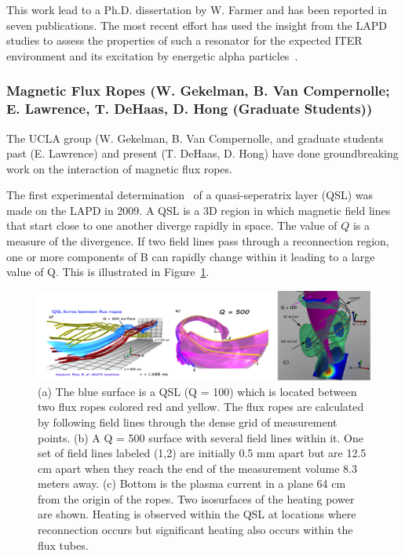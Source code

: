 \documentclass[11pt]{article}
\renewcommand{\cite}{\citep}
\begin{document}
This work lead to a Ph.D. dissertation by W. Farmer and has been
reported in seven publications. The most recent effort has used the
insight from the LAPD studies to assess the properties of such a
resonator for the expected ITER environment and its excitation by
energetic alpha particles~\cite{farmer:2014}.


\subsubsection{Magnetic Flux Ropes (W. Gekelman, B. Van Compernolle; E.
Lawrence, T. DeHaas, D. Hong (Graduate Students))}

The UCLA group (W. Gekelman, B. Van Compernolle, and graduate students
past (E. Lawrence) and present (T. DeHaas, D. Hong) have done
groundbreaking work on the interaction of magnetic flux ropes. 

The first experimental
determination~\cite{lawrence:2009} of a quasi-seperatrix layer
(QSL) was made on the LAPD in 2009. A QSL is a 3D region in which
magnetic field lines that start close to one another diverge rapidly in
space. The value of $Q$ is a measure of the divergence. If two field lines
pass through a reconnection region, one or more components of B can
rapidly change within it leading to a large value of Q. This is
illustrated in Figure~\ref{ropes}.

\begin{figure}[!htbp]
\centerline{\includegraphics[width=6.2truein]{ropes}}
\caption{\small (a) The blue surface is a QSL (Q = 100) which is located
between two flux ropes colored red and yellow. The flux ropes
are calculated by following field lines through the dense grid of
measurement points. (b) A Q = 500 surface with several field lines
within it. One set of field lines labeled (1,2) are initially 0.5 mm
apart but are 12.5 cm apart when they reach the end of the measurement
volume 8.3 meters away. (c) Bottom is the plasma current in a plane 64 cm from the origin
of the ropes.  Two
isosurfaces of the heating power are shown. Heating is observed within
the QSL at locations where reconnection occurs but significant heating
also occurs within the flux tubes.}\label{ropes}
\end{figure}
\end{document}
